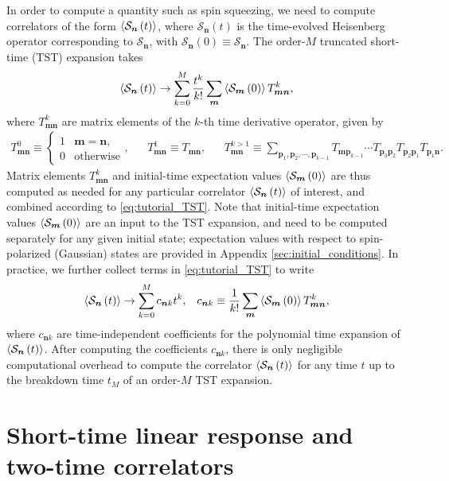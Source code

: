 \documentclass[pra,twocolumn,longbibliography]{revtex4-2}
\renewcommand{\t}{\text} %
\newcommand{\f}[2]{\dfrac{#1}{#2}} %
\newcommand{\p}[1]{\left( #1 \right)} %
\renewcommand{\v}{\bm} %
\newcommand{\bk}{\braket} %
\renewcommand{\S}{\mathcal{S}}
\newcommand{\1}{\mathds{1}}
\begin{document}
In order to compute a quantity such as spin squeezing, we need to
compute correlators of the form $\bk{\S_{\v n}\p{t}}$, where
$\S_{\v n}\p{t}$ is the time-evolved Heisenberg operator corresponding
to $\S_{\v n}$, with $\S_{\v n}\p{0}\equiv\S_{\v n}$.  The order-$M$
truncated short-time (TST) expansion takes
\begin{align}
  \bk{\S_{\v n}\p{t}}
  \to \sum_{k=0}^M \f{t^k}{k!}
  \sum_{\v m} \bk{\S_{\v m}\p{0}} T^k_{\v m\v n},
  \label{eq:tutorial_TST}
\end{align}
where $T^k_{\v m\v n}$ are matrix elements of the $k$-th time
derivative operator, given by
\begin{align}
  T^0_{\v m\v n} \equiv
    \begin{cases}
      1 & \v m = \v n, \\
      0 & \t{otherwise}
    \end{cases},
  &&
  T^1_{\v m\v n} \equiv T_{\v m\v n},
  &&
  T^{k>1}_{\v m\v n}
  \equiv \sum_{\v p_1,\v p_2,\cdots,\v p_{k-1}}
  T_{\v m\v p_{k-1}} \cdots T_{\v p_3\v p_2}
  T_{\v p_2\v p_1} T_{\v p_1\v n}.
\end{align}
Matrix elements $T^k_{\v m\v n}$ and initial-time expectation values
$\bk{\S_{\v m}\p{0}}$ are thus computed as needed for any particular
correlator $\bk{\S_{\v n}\p{t}}$ of interest, and combined according
to \eqref{eq:tutorial_TST}.  Note that initial-time expectation values
$\bk{\S_{\v m}\p{0}}$ are an input to the TST expansion, and need to
be computed separately for any given initial state; expectation values
with respect to spin-polarized (Gaussian) states are provided in
Appendix \ref{sec:initial_conditions}.  In practice, we further
collect terms in \eqref{eq:tutorial_TST} to write
\begin{align}
  \bk{\S_{\v n}\p{t}} \to \sum_{k=0}^M c_{\v n k} t^k,
  &&
  c_{\v n k}
  \equiv \f1{k!} \sum_{\v m} \bk{\S_{\v m}\p{0}} T^k_{\v m\v n},
\end{align}
where $c_{\v n k}$ are time-independent coefficients for the
polynomial time expansion of $\bk{\S_{\v n}\p{t}}$.  After computing
the coefficients $c_{\v n k}$, there is only negligible computational
overhead to compute the correlator $\bk{\S_{\v n}\p{t}}$ for any time
$t$ up to the breakdown time $t_M$ of an order-$M$ TST expansion.


\section{Short-time linear response and two-time correlators}
\label{sec:linear_response}
\end{document}
